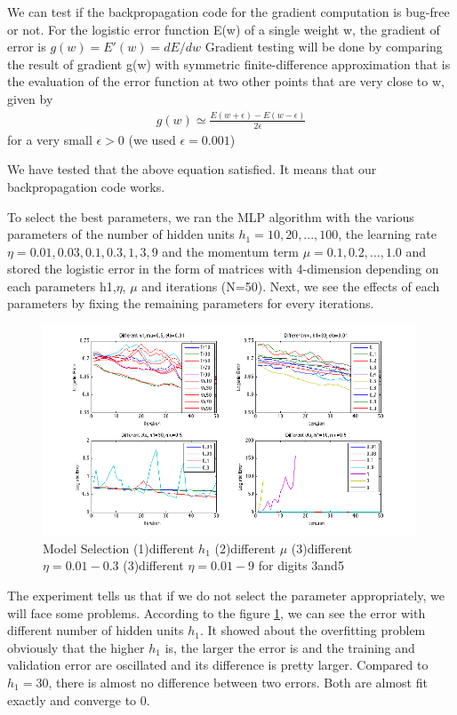 \begin{enumerate}[(1)]
We can test if the backpropagation code for the gradient computation is bug-free or not. For the logistic error function E(w) of a single weight w, the gradient of error is
$g(w)=E'(w)=dE/dw$
Gradient testing will be done by comparing the result of gradient g(w) with symmetric finite-difference approximation that is the evaluation of the error function at two other points that are very close to w, given by
\begin{align}
g(w)\simeq\frac{E(w+\epsilon)-E(w-\epsilon)}{2\epsilon}
\end{align}
for a very small $\epsilon > 0$ (we used $\epsilon = 0.001$)

We have tested that the above equation satisfied. It means that our backpropagation code works.
 
To select the best parameters, we ran the MLP algorithm with the various parameters of the number of hidden units $h_{1}=10,20,...,100$, the learning rate $\eta=0.01,0.03,0.1,0.3,1,3,9$ and the momentum term $\mu={0.1,0.2,...,1.0}$ and stored the logistic error in the form of matrices with 4-dimension depending on each parameters h1,$\eta$, $\mu$ and iterations (N=50). Next, we see the effects of each parameters by fixing the remaining parameters for every iterations.
	\begin{figure}[htbp]
		\centering
		\includegraphics[width=0.99\textwidth]{plots/h1,mu,eta.png}
		\caption{Model Selection (1)different $h_1$ (2)different $\mu$ (3)different $\eta=0.01-0.3$ (3)different $\eta=0.01-9$ for digits 3and5}
		\label{fig:h1,mu,eta}
	\end{figure}
The experiment tells us that if we do not select the parameter appropriately, we will face some problems. According to the figure \ref{fig:h1,mu,eta}, we can see the error with different number of hidden units $h_1$. It showed about the overfitting problem obviously that the higher $h_1$ is, the larger the error is and the training and validation error are oscillated and its difference is pretty larger. Compared to $h_{1}=30$, there is almost no difference between two errors. Both are almost fit exactly and converge to 0.


\end{enumerate}
